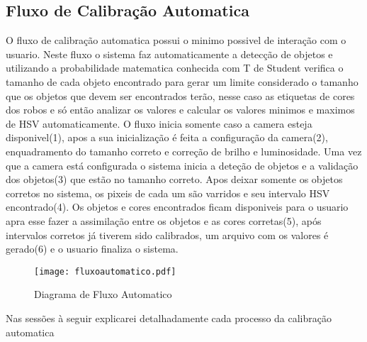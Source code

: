 	\subsection{Fluxo de Calibração Automatica}	
	O fluxo de calibração automatica possui o minimo possivel de interação com o usuario. Neste fluxo o sistema faz automaticamente a detecção de objetos e utilizando a probabilidade matematica conhecida com T de Student verifica o tamanho de cada objeto encontrado para gerar um limite considerado o tamanho que os objetos que devem ser encontrados terão, nesse caso as etiquetas de cores dos robos e só então analizar os valores e calcular os valores minimos e maximos de HSV automaticamente.	
	O fluxo inicia somente caso a camera esteja disponivel(1), apos a sua inicialização é feita a configuração da camera(2), enquadramento do tamanho correto e correção de brilho e luminosidade. Uma vez que a camera está configurada o sistema inicia a deteção de objetos e a validação dos objetos(3) que estão no tamanho correto. Apos deixar somente os objetos corretos no sistema, os pixeis de cada um são varridos e seu intervalo HSV encontrado(4). Os objetos e cores encontrados ficam disponiveis para o usuario apra esse fazer a assimilação entre os objetos e as cores corretas(5), após intervalos corretos já tiverem sido calibrados, um arquivo com os valores é gerado(6) e o usuario finaliza o sistema.
		\begin{figure}[!h]
				\centering
				\texttt{[image: fluxoautomatico.pdf]}
				\caption{Diagrama de Fluxo Automatico}
				\label{DiagramaDeFluxoAutomatico}
			\end{figure} 
			
		Nas sessões à seguir explicarei detalhadamente cada processo da calibração automatica

